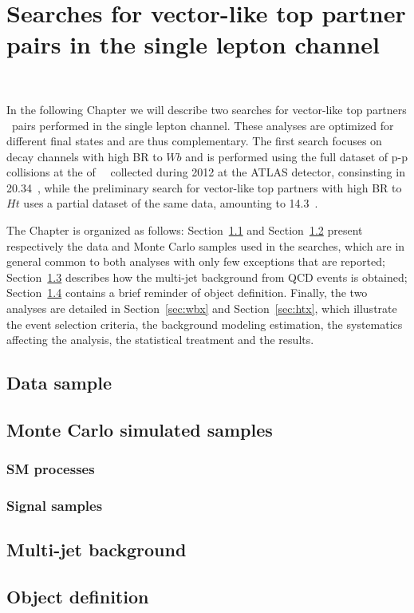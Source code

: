 \clearpage{\pagestyle{empty}\cleardoublepage}

\chapter{Searches for vector-like top partner pairs in the single lepton channel}~\label{chap:vlq}

In the following Chapter we will describe two searches for vector-like 
top partners \TTbar\ pairs performed in the single lepton channel. These analyses
are optimized for different final states and are thus complementary.
The first search focuses on decay channels with high BR to $Wb$ and is 
performed using the full dataset of p-p collisions at the \cme of ~\tev\
collected during 2012 at the ATLAS detector, consinsting in 20.34~\ifb, while
the preliminary search for vector-like top partners with high BR to $Ht$
uses a partial dataset of the same data, amounting to 14.3~\ifb.

The Chapter is organized as follows: Section~\ref{sec:data} and Section~\ref{sec:MCbkg}
present respectively the data and Monte Carlo samples used in the searches, which
are in general common to both analyses with only few exceptions that are reported;
Section~\ref{sec:qcdbkg} describes how the multi-jet background from QCD events is
obtained; Section~\ref{sec:objects} contains a brief reminder of object definition.
Finally, the two analyses are detailed in Section~\ref{sec:wbx} and Section~\ref{sec:htx}, 
which illustrate the event selection criteria, the background modeling estimation, 
the systematics affecting the analysis, the statistical treatment and the
results.

\section{Data sample}\label{sec:data}

\section{Monte Carlo simulated samples}\label{sec:MCbkg}

\subsection{SM processes}\label{subsec:MCsmbkg}

\subsection{Signal samples}\label{subsec:MCsignal}

\section{Multi-jet background}\label{sec:qcdbkg}

\section{Object definition}\label{sec:objects}




